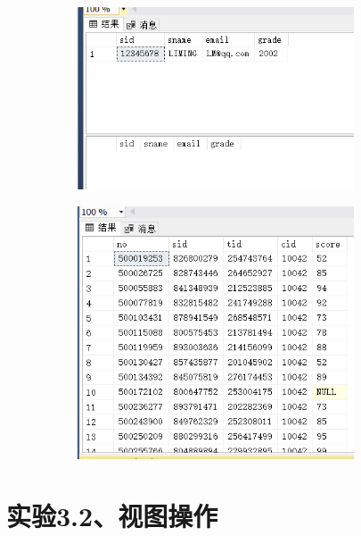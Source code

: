 \documentclass[a4paper,twoside]{article}
\begin{document}
\begin{spacing}{1.2}
\begin{enumerate}
  \begin{figure}[htb]
    \centering
    \begin{subfigure}{0.4\textwidth}
      \centering
      \includegraphics[width=0.9\textwidth]{7.png}
    \end{subfigure}
    \begin{subfigure}{0.4\textwidth}
      \centering
      \includegraphics[width=0.9\textwidth]{8.png}
    \end{subfigure}
  \end{figure}
  
\end{enumerate}

\section{实验3.2、视图操作}


\end{spacing}
\end{document}
